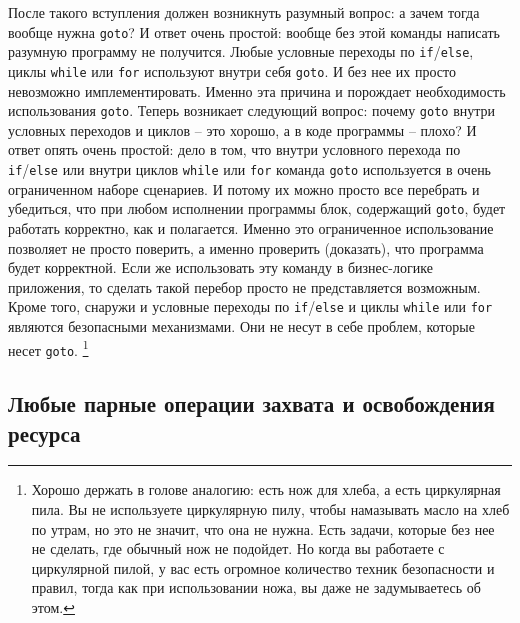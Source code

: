 После такого вступления должен возникнуть разумный вопрос: а зачем тогда вообще нужна \verb"goto"?
И ответ очень простой: вообще без этой команды написать разумную программу не получится.
Любые условные переходы по \verb"if"/\verb"else", циклы \verb"while" или \verb"for" используют внутри себя \verb"goto".
И без нее их просто невозможно имплементировать.
Именно эта причина и порождает необходимость использования \verb"goto".
Теперь возникает следующий вопрос: почему \verb"goto" внутри условных переходов и циклов -- это хорошо, а в коде программы -- плохо?
И ответ опять очень простой: дело в том, что внутри условного перехода по \verb"if"/\verb"else" или внутри циклов \verb"while" или \verb"for" команда \verb"goto" используется в очень ограниченном наборе сценариев.
И потому их можно просто все перебрать и убедиться, что при любом исполнении программы блок, содержащий \verb"goto", будет работать корректно, как и полагается.
Именно это ограниченное использование позволяет не просто поверить, а именно проверить (доказать), что программа будет корректной.
Если же использовать эту команду в бизнес-логике приложения, то сделать такой перебор просто не представляется возможным.
Кроме того, снаружи и условные переходы по \verb"if"/\verb"else" и циклы \verb"while" или \verb"for" являются безопасными механизмами.
Они не несут в себе проблем, которые несет \verb"goto".%
\footnote{Хорошо держать в голове аналогию: есть нож для хлеба, а есть циркулярная пила.
Вы не используете циркулярную пилу, чтобы намазывать масло на хлеб по утрам, но это не значит, что она не нужна.
Есть задачи, которые без нее не сделать, где обычный нож не подойдет.
Но когда вы работаете с циркулярной пилой, у вас есть огромное количество техник безопасности и правил, тогда как при использовании ножа, вы даже не задумываетесь об этом.}

\subsection{Любые парные операции захвата и освобождения ресурса}

